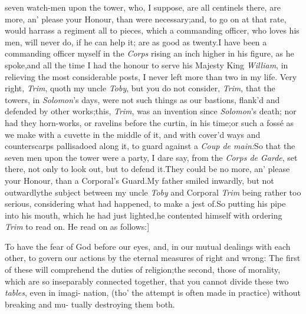 \documentclass{article}
\begin{document}
\noindent
{}
seven watch-men upon the tower, who, I suppose, are all centinels there,\tsk
are more,
an’ please your Honour, than were necessary;\tsk and, to go
on at that rate, would harrass a regiment all to pieces, which
a commanding officer, who loves his men, will never do, if he can
help it;\break
{}
are as good as
twenty.\tsk I have been a commanding officer myself in the
\textit{Corps}
rising an inch higher in his figure, as he spoke,\tsk and all the
time I had the honour to serve his Majesty King \textit{William}, in
relieving the most considerable posts, I never left more than two
in my life.\tsk{}
Very right, \textit{Trim}, quoth my uncle \textit{Toby},\break
\tsk but you do not consider, \textit{Trim}, that the
towers, in \textit{Solomon}’s days, were not such things as our
bastions, flank’d and defended by other works;\tsk this,
\textit{Trim}, was an invention since \textit{Solomon}’s death;
nor had they horn-works, or ravelins before the curtin, in his
time;\tsk or such a fossé as we make with a cuvette
in the middle of it, and with cover’d ways and counterscarps
pallisadoed along it, to guard against a \textit{Coup de
main:}\tsk So that the seven men upon the tower were a party,
I dare say, from the \textit{Corps de Garde}, set there, not only to
look out, but to defend it.\tsk They could be no more, an’
please your Honour, than a Corporal’s Guard.\tsk My father
smiled inwardly,\tsk\break
but not outwardly\tsk the subject between
my uncle \textit{Toby} and Corporal \textit{Trim} being rather
too serious, considering what had happened, to make a jest
of.\tsk So putting his pipe into his mouth, which he had just
lighted,\tsk he contented himself with ordering \textit{Trim} to
read on. He read on as follows:]

\lqq To have the fear of God before our\break
\lqq eyes, and, in our mutual dealings with\break
\lqq each other, to govern our actions by the\break
\lqq eternal measures of right and wrong:\tsk\break
\lqq The first of these will comprehend the\break
\lqq duties of religion;\tsh the second, those\break
\lqq of morality, which are so inseparably\break
\lqq connected together, that you cannot\break
\lqq divide these two \textit{tables}, even in imagi-\break
\lqq nation, (tho’ the attempt is often made\break
\lqq in practice) without breaking and mu-\break
\lqq tually destroying them both.  
\end{document}
